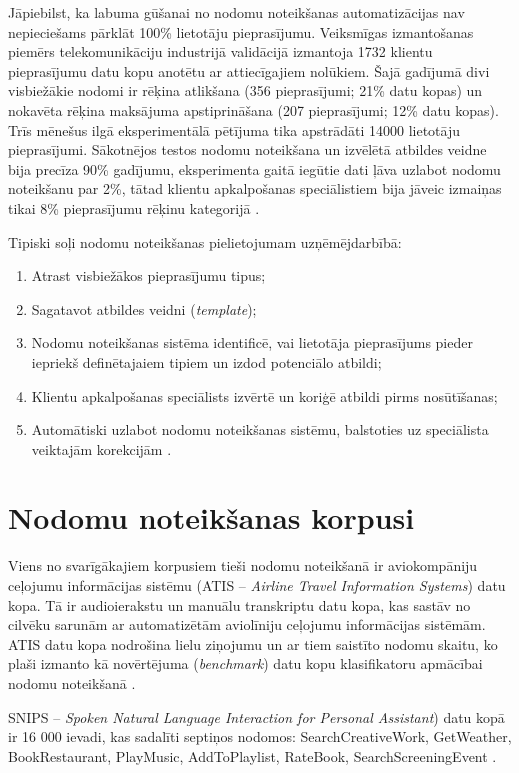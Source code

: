 Jāpiebilst, ka labuma gūšanai no nodomu noteikšanas automatizācijas nav nepieciešams pārklāt 100\% lietotāju pieprasījumu. Veiksmīgas izmantošanas piemērs telekomunikāciju industrijā validācijā izmantoja 1732 klientu pieprasījumu datu kopu anotētu ar attiecīgajiem nolūkiem. Šajā gadījumā divi visbiežākie nodomi ir rēķina atlikšana (356 pieprasījumi; 21\% datu kopas) un nokavēta rēķina maksājuma apstiprināšana (207 pieprasījumi; 12\% datu kopas). Trīs mēnešus ilgā eksperimentālā pētījuma tika apstrādāti 14000 lietotāju pieprasījumi. Sākotnējos testos nodomu noteikšana un izvēlētā atbildes veidne bija precīza 90\% gadījumu, eksperimenta gaitā iegūtie dati ļāva uzlabot nodomu noteikšanu par 2\%, tātad klientu apkalpošanas speciālistiem bija jāveic izmaiņas tikai 8\% pieprasījumu rēķinu kategorijā \cite{paikens2020}.

Tipiski soļi nodomu noteikšanas pielietojumam uzņēmējdarbībā:
\begin{enumerate}
	\item Atrast visbiežākos pieprasījumu tipus;
	\item Sagatavot atbildes veidni (\textit{template});
	\item Nodomu noteikšanas sistēma identificē, vai lietotāja pieprasījums pieder iepriekš definētajaiem tipiem un izdod potenciālo atbildi;
	\item Klientu apkalpošanas speciālists izvērtē un koriģē atbildi pirms nosūtīšanas;
	\item Automātiski uzlabot nodomu noteikšanas sistēmu, balstoties uz speciālista veiktajām korekcijām \cite{paikens2020}.
\end{enumerate}



\section{Nodomu noteikšanas korpusi}


Viens no svarīgākajiem korpusiem tieši nodomu noteikšanā ir aviokompāniju ceļojumu informācijas sistēmu (ATIS -- \textit{Airline Travel Information Systems}) datu kopa. Tā ir audioierakstu un manuālu transkriptu datu kopa, kas sastāv no cilvēku sarunām ar automatizētām aviolīniju ceļojumu informācijas sistēmām. ATIS datu kopa nodrošina lielu ziņojumu un ar tiem saistīto nodomu skaitu, ko plaši izmanto kā novērtējuma (\textit{benchmark}) datu kopu klasifikatoru apmācībai nodomu noteikšanā \cite{atis1990}.


SNIPS -- \textit{Spoken Natural Language Interaction for Personal Assistant}) datu kopā ir 16 000 ievadi, kas sadalīti septiņos nodomos: SearchCreativeWork, GetWeather, BookRestaurant, PlayMusic, AddToPlaylist, RateBook, SearchScreeningEvent \cite{snips-2018}.



